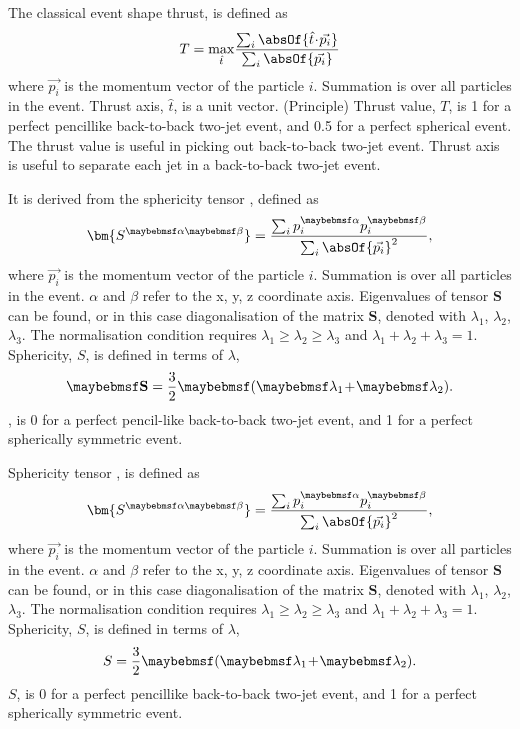 The classical event shape thrust\cite{PhysRevLett.39.1587}, is defined as
\begin{equation}
T = \max_{\hat{t}}\!\frac{\sum_{i}\absOf{\hat{t}\!\cdot\!\vec{p_{i}}}}{\sum_{i}\absOf{\vec{p_{i}}}}
\end{equation}
where $\vec{p_{i}}$ is the momentum vector of the particle $i$. Summation is over all particles in the event. Thrust axis, $\hat{t}$, is a unit vector. (Principle) Thrust value, $T$, is 1 for a perfect pencillike back-to-back two-jet event, and 0.5 for a perfect spherical event. The thrust value is useful in picking out back-to-back two-jet event. Thrust axis is useful to separate each jet in a back-to-back two-jet event.

It is  derived from the sphericity tensor \cite{PhysRevLett.35.1609}, defined as
\begin{equation}
\bm{S^{\alpha\beta}} = \frac{\sum_{i}p^{\alpha}_{i}p^{\beta}_{i}}{\sum_{i}\absOf{\vec{p_{i}}}^2},
\end{equation}
where $\vec{p_{i}}$ is the momentum vector of the particle $i$. Summation is over all particles in the event. $\alpha$ and $\beta$ refer to the x, y, z coordinate axis. Eigenvalues of tensor $\bm{S}$ can be found, or in this case diagonalisation of the matrix $\bm{S}$, denoted with $\lambda_{1}$, $\lambda_{2}$, $\lambda_{3}$. The normalisation condition requires $\lambda_{1}\!\geqslant\! \lambda_{2} \! \geqslant \! \lambda_{3}$ and $ \lambda_{1} \! + \! \lambda_{2} \! + \! \lambda_{3} \! = \! 1 $. Sphericity, $S$, is defined in terms of $\lambda$,
\begin{equation}
\sphericity = \frac{3}{2}\parenths{\lambda_{1} \! + \! \lambda_{2}}.
\end{equation}
\sphericity, is 0 for a perfect pencil-like back-to-back two-jet event, and 1 for a perfect spherically symmetric event.

Sphericity tensor \cite{PhysRevLett.35.1609}, is defined as
\begin{equation}
\bm{S^{\alpha\beta}} = \frac{\sum_{i}p^{\alpha}_{i}p^{\beta}_{i}}{\sum_{i}\absOf{\vec{p_{i}}}^2},
\end{equation}
where $\vec{p_{i}}$ is the momentum vector of the particle $i$. Summation is over all particles in the event. $\alpha$ and $\beta$ refer to the x, y, z coordinate axis. Eigenvalues of tensor $\bm{S}$ can be found, or in this case diagonalisation of the matrix $\bm{S}$, denoted with $\lambda_{1}$, $\lambda_{2}$, $\lambda_{3}$. The normalisation condition requires $\lambda_{1}\!\geqslant\! \lambda_{2} \! \geqslant \! \lambda_{3}$ and $ \lambda_{1} \! + \! \lambda_{2} \! + \! \lambda_{3} \! = \! 1 $. Sphericity, $S$, is defined in terms of $\lambda$,
\begin{equation}
S = \frac{3}{2}\parenths{\lambda_{1} \! + \! \lambda_{2}}.
\end{equation}
$S$, is 0 for a perfect pencillike back-to-back two-jet event, and 1 for a perfect spherically symmetric event.

